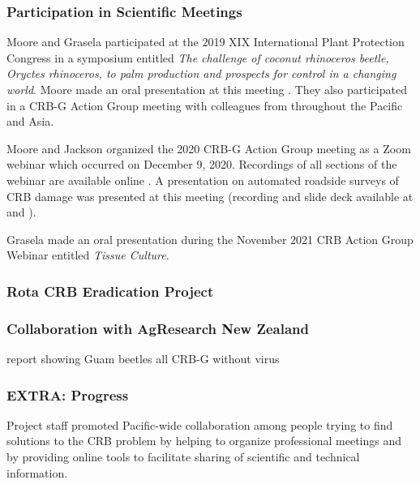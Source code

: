 \documentclass[12pt,letterpaper,english,bibliography=totocnumbered,abstract=on]{scrartcl}
\begin{document}
\subsubsection{Participation in Scientific Meetings}

Moore and Grasela participated at the 2019 XIX International Plant Protection Congress in a symposium entitled \textit{The challenge of coconut rhinoceros beetle, Oryctes rhinoceros, to palm production and prospects for control in a changing world}. Moore made an oral presentation at this meeting \parencite{moore_status_2019}.
They also participated in a CRB-G Action Group meeting with colleagues from throughout the Pacific and Asia.

Moore and Jackson organized the 2020 CRB-G Action Group meeting as a Zoom webinar which occurred on December 9, 2020. Recordings of all sections of the webinar are available online \cite{mooreVideoRecordingCRBG2020}. A presentation on automated roadside surveys of CRB damage was presented at this meeting (recording and slide deck available at \cite{mooreVideoRecordingCRBG2020} and \cite{mooreAutomatedRoadsideVideo2020}).

Grasela made an oral presentation during the November 2021 CRB Action Group Webinar entitled \emph{Tissue Culture}.

\subsubsection{Rota CRB Eradication Project}


\subsubsection{Collaboration with AgResearch New Zealand}


report showing Guam beetles all CRB-G without virus \cite{marshallCRBHaplotypePCR2021}

\subsubsection{EXTRA: Progress}

Project staff promoted Pacific-wide collaboration among people trying to find solutions to the CRB problem by helping to organize professional meetings and by providing online tools to facilitate sharing of scientific and technical information.
\end{document}
